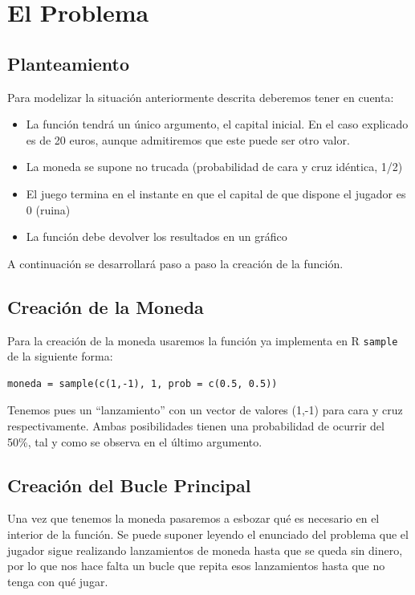 \documentclass[10pt,a4paper]{article}
\begin{document}
\section{El Problema}
\subsection{Planteamiento}
Para modelizar la situación anteriormente descrita deberemos tener en cuenta:

\begin{itemize}
\item La función tendrá un único argumento, el capital inicial. En el caso explicado es de 20 euros, aunque admitiremos que este puede ser otro valor.
\item La moneda se supone no trucada (probabilidad de cara y cruz idéntica, 1/2)
\item El juego termina en el instante en que el capital de que dispone el jugador es 0 (ruina)
\item La función debe devolver los resultados en un gráfico
\end{itemize}

A continuación se desarrollará paso a paso la creación de la función.

\subsection{Creación de la Moneda}
Para la creación de la moneda usaremos la función ya implementa en R {\tt sample} de la siguiente forma:

\begin{verbatim}
moneda = sample(c(1,-1), 1, prob = c(0.5, 0.5))
\end{verbatim}

Tenemos pues un ``lanzamiento'' con un vector de valores (1,-1) para cara y cruz respectivamente. Ambas posibilidades tienen una probabilidad de ocurrir del 50\%, tal y como se observa en el último argumento.

\subsection{Creación del Bucle Principal}
Una vez que tenemos la moneda pasaremos a esbozar qué es necesario en el interior de la función. Se puede suponer leyendo el enunciado del problema que el jugador sigue realizando lanzamientos de moneda hasta que se queda sin dinero, por lo que nos hace falta un bucle que repita esos lanzamientos hasta que no tenga con qué jugar.
\end{document}

